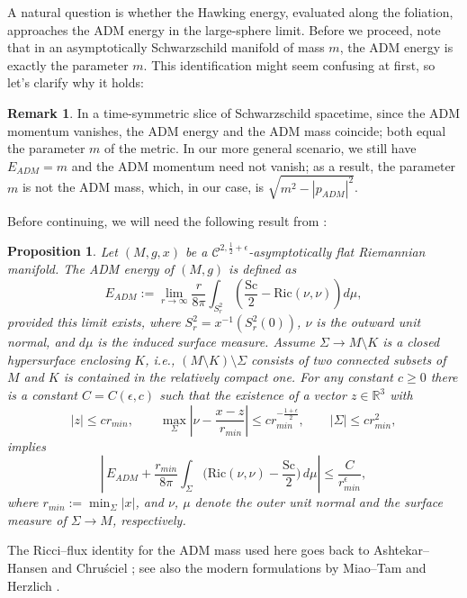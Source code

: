 \documentclass[12pt,a4paper]{amsart}
\theoremstyle{plain}
\newtheorem{proposition}[theorem]{Proposition}
\theoremstyle{definition}
\newtheorem{remark}[theorem]{Remark}
\begin{document}
A natural question is whether the Hawking energy, evaluated along the foliation, approaches the ADM energy in the large-sphere limit. Before we proceed, note that in an asymptotically Schwarzschild manifold of mass $m$, the ADM energy is exactly the parameter 
$m$. This identification might seem confusing at first, so let’s clarify why it holds:

\begin{remark}\label{remarkm}
In a time-symmetric slice of Schwarzschild spacetime, since the   ADM momentum vanishes, the ADM energy and the ADM mass coincide; both equal 
 the parameter $m$ of the metric.  In our more general scenario, we still have $E_{ADM}=m$ and the ADM momentum need not vanish; as a result, the parameter $m$ is not the ADM mass, which, in our case, is $\sqrt{m^2-|p_{ADM}|^2} $.
\end{remark}
Before continuing, we will need the following result from \cite[Proposition A1]{Nerz2}:
\begin{proposition}\label{nertzlemma}
Let $(M, g, x)$ be a $\mathcal{C}^{2, \frac{1}{2}+\epsilon}$-asymptotically flat Riemannian manifold. The ADM energy of $(M,g)$ is defined as
\[
E_{ADM} := \lim_{r \to \infty}  \frac{r}{8\pi} \int_{S_r^2} \left(  \frac{\mathrm{Sc}}{2} - \mathrm{Ric}(\nu,\nu) \right) d\mu ,
\]
provided this limit exists, where $S_r^2 = x^{-1}(S_r^2(0))$, $\nu$ is the outward unit normal, and $d\mu$ is the induced surface measure. Assume $\Sigma \to M \setminus K$ is a closed hypersurface enclosing $K$, i.e., $(M \setminus K)\setminus\Sigma$ consists of two connected subsets of $M$ and $K$ is contained in the relatively compact one. For any constant $c \geq 0$ there is a constant $C = C(\epsilon,  c)$ such that the existence of a vector $z \in \mathbb{R}^3$ with
\[
|z| \leq c r_{min}, \qquad 
\max_{\Sigma} \left| \nu - \frac{x - z}{\, r_{min}} \right| \leq c r_{min}^{-\frac{1+\epsilon}{2}}, \qquad 
|\Sigma| \leq c r_{min}^2,
\]
implies
\[
\left|\, E_{ADM} + \frac{r_{min}}{8\pi} \int_{\Sigma} \bigl(\mathrm{Ric}(\nu,\nu) - \frac{\mathrm{Sc}}{2}\bigr) \, d\mu \right| \leq \frac{C}{r_{min}^\epsilon},
\]
where $r_{min}:= \min_{\Sigma}|x|$, and $\nu$, $\mu$ denote the outer unit normal and the surface measure of $\Sigma \to M$, respectively.
\end{proposition}

The Ricci–flux identity for the ADM mass used here goes back to Ashtekar–Hansen \cite{ashtekar1978unified} and Chruściel \cite{chrusciel1986remark}; see also the modern formulations by Miao–Tam \cite{miao2016evaluation} and Herzlich \cite{herzlich2016computing}.
\end{document}
